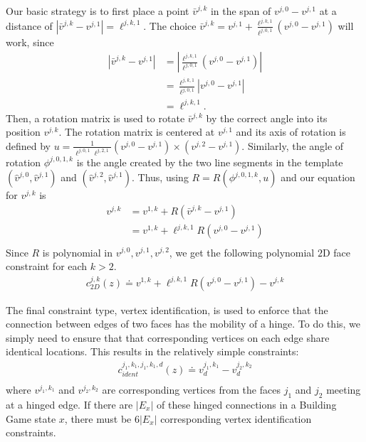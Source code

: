 
Our basic strategy is to first place a point $\bar{v}^{j,k}$ in the span of $v^{j,0} - v^{j,1}$ at a distance of $|\bar{v}^{j,k} - v^{j,1}| = \ell^{j,k,1}$. The choice $\bar{v}^{j,k} = v^{j,1} + \frac{\ell^{j,k,1}}{\ell^{j,0,1}}(v^{j,0} - v^{j,1})$ will work, since 
\begin{align}
  |\bar{v}^{j,k} - v^{j,1}| &= |\frac{\ell^{j,k,1}}{\ell^{j,0,1}}(v^{j,0} - v^{j,1})| \\
  &= \frac{\ell^{j,k,1}}{\ell^{j,0,1}}|v^{j,0} - v^{j,1}| \\
  &= \ell^{j,k,1}.
\end{align}
Then, a rotation matrix is used to rotate $\bar{v}^{j,k}$ by the correct angle into its position $v^{j,k}$.
The rotation matrix is centered at $v^{j,1}$ and its axis of rotation is defined by $u = \frac{1}{\ell^{j,0,1}\ell^{j,2,1}}(v^{j,0} - v^{j,1})\times(v^{j,2} - v^{j,1})$.  Similarly, the angle of rotation $\phi^{j,0,1,k}$ is the angle created by the two line segments in the template $(\hat{v}^{j,0},\hat{v}^{j,1})$ and  $(\hat{v}^{j,2},\hat{v}^{j,1})$. Thus, using $R = R(\phi^{j,0,1,k}, u)$ and our equation for $v^{j,k}$ is 
\begin{align}
v^{j,k} &= v^{1,k} + R(\bar{v}^{j,k} - v^{j,1})\\
&= v^{1,k} + \ell^{j,k,1}R(v^{j,0} - v^{j,1})\\
\end{align}
Since $R$ is polynomial in $v^{j,0}, v^{j,1}, v^{j,2}$, we get the following polynomial $2$D face constraint for each $k > 2$.
\begin{align}
c_{2D}^{j,k}(z) \doteq v^{1,k} + \ell^{j,k,1}R(v^{j,0} - v^{j,1}) - v^{j,k}
\end{align} 

The final constraint type, vertex identification, is used to enforce that the connection between edges of two faces has the mobility of a hinge. To do this, we simply need to ensure that that corresponding vertices on each edge share identical locations. This results in the relatively simple constraints:
\begin{align}
c_{ident}^{j_1,k_1,j_1,k_1,d}(z) \doteq v^{j_1,k_1}_d - v^{j_2,k_2}_d \\
\end{align}
where $v^{j_1,k_1}$ and $v^{j_2,k_2}$ are corresponding vertices from the faces $j_1$ and $j_2$ meeting at a hinged edge. If there are $|E_x|$ of these hinged connections in a Building Game state $x$, there must be $6|E_x|$ corresponding vertex identification constraints.

